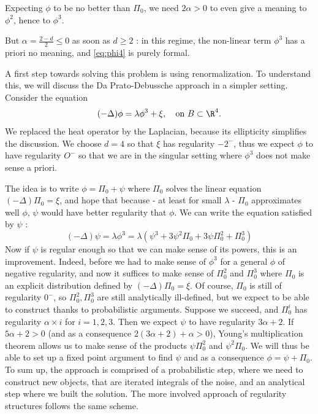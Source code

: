 Expecting $\phi$ to be no better than $\Pi_0$, we need $2\alpha>0$ to even give a meaning to $\phi^2$, hence to $\phi^3$.

But $\alpha = \frac{2-d}{2}\leq 0$ as soon as $d\geq 2$ : in this regime, the non-linear term $\phi^3$ has a priori no meaning, and \eqref{eq:phi4} is purely formal.

A first step towards solving this problem is using renormalization. To understand this, we will discuss the Da Prato-Debussche approach in a simpler setting.
Consider the equation
\begin{equation}
    (-\Delta)\phi = \lambda \phi^3 + \xi, \quad \text{on }B\subset \R^4.
\end{equation}
We replaced the heat operator by the Laplacian, because its ellipticity simplifies the discussion. We choose $d=4$ so that $\xi$ has regularity $-2^-$, thus we expect $\phi$ to have regularity $O^-$ so that we are in the singular setting where $\phi^3$ does not make sense a priori.

The idea is to write $\phi = \Pi_0 + \psi$ where $\Pi_0$ solves the linear equation $(-\Delta)\Pi_0 = \xi$, and hope that because - at least for small $\lambda$ - $\Pi_0$ approximates well $\phi$, $\psi$ would have better regularity that $\phi$.
We can write the equation satisfied by $\psi$ : 
\begin{equation*}
    (-\Delta)\psi = \lambda \phi^3 = \lambda (\psi^3 + 3 \psi^2 \Pi_0 + 3 \psi \Pi_0^2 + \Pi_0^3)
\end{equation*}
Now if $\psi$ is regular enough so that we can make sense of its powers, this is an improvement. 
Indeed, before we had to make sense of $\phi^3$ for a general $\phi$ of negative regularity, and now it suffices to make sense of $\Pi_0^2$ and $\Pi_0^3$ where $\Pi_0$ is an explicit distribution defined by $(-\Delta)\Pi_0 = \xi$.
Of course, $\Pi_0$ is still of regularity $0^-$, so $\Pi_0^2,\Pi_0^3$ are still analytically ill-defined, but we expect to be able to construct thanks to probabilistic arguments.
Suppose we succeed, and $\Pi_0^i$ has regularity $\alpha \times i$ for $i=1,2,3$. Then we expect $\psi$ to have regularity $3\alpha +2$.
If $5\alpha + 2 >0$ (and as a consequence $2(3\alpha +2) + \alpha >0$), Young's multiplication theorem allows us to make sense of the products $\psi \Pi_0^2$ and $\psi^2 \Pi_0$. We will thus be able to set up a fixed point argument to find $\psi$ and as a consequence $\phi = \psi + \Pi_0$.
To sum up, the approach is comprised of a probabilistic step, where we need to construct new objects, that are iterated integrals of the noise, and an analytical step where we built the solution.
The more involved approach of regularity structures follows the same scheme.

